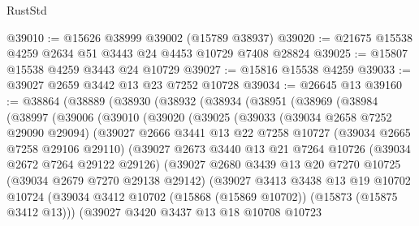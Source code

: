 \begin{lexlean}{RustStd}
\begin{coremodule}
@39010 := @15626 @38999 @39002 (@15789 @38937)
@39020 := @21675 @15538 @4259 @2634 @51 @3443 @24 @4453 @10729 @7408 @28824
@39025 := @15807 @15538 @4259 @3443 @24 @10729
@39027 := @15816 @15538 @4259
@39033 := @39027 @2659 @3442 @13 @23 @7252 @10728
@39034 := @26645 @13
@39160 := @38864
    (@38889
      (@38930
        (@38932
          (@38934
            (@38951
              (@38969
                (@38984
                  (@38997
                    (@39006
                      (@39010
                        (@39020
                          (@39025
                            (@39033
                              (@39034 @2658 @7252 @29090 @29094)
                              (@39027
                                @2666
                                @3441
                                @13
                                @22
                                @7258
                                @10727
                                (@39034 @2665 @7258 @29106 @29110)
                                (@39027
                                  @2673
                                  @3440
                                  @13
                                  @21
                                  @7264
                                  @10726
                                  (@39034 @2672 @7264 @29122 @29126)
                                  (@39027
                                    @2680
                                    @3439
                                    @13
                                    @20
                                    @7270
                                    @10725
                                    (@39034 @2679 @7270 @29138 @29142)
                                    (@39027
                                      @3413
                                      @3438
                                      @13
                                      @19
                                      @10702
                                      @10724
                                      (@39034
                                        @3412
                                        @10702
                                        (@15868 (@15869 @10702))
                                        (@15873 (@15875 @3412 @13)))
                                      (@39027
                                        @3420
                                        @3437
                                        @13
                                        @18
                                        @10708
                                        @10723

\end{coremodule}
\end{lexlean}
